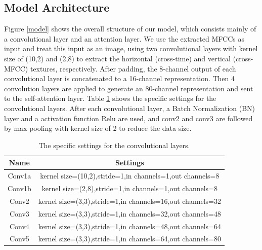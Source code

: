 \documentclass[10pt, conference, compsocconf]{IEEEtran}
\begin{document}
\subsection{Model Architecture}
Figure \ref{model} shows the overall structure of our model, which consists mainly of a convolutional layer and an attention layer.
We use the extracted MFCCs as input and treat this input as an image, using two convolutional layers with kernel size of (10,2) and (2,8) to extract the horizontal (cross-time) and vertical (cross-MFCC) textures, respectively. After padding, the 8-channel output of each convolutional layer is concatenated to a 16-channel representation. Then 4 convolution layers are applied to generate an 80-channel representation and sent to the self-attention layer. 
Table \ref{ConvSettings} shows the specific settings for the convolutional layers. After each convolutional layer, a Batch Normalization (BN) layer and a activation function Relu are used, and conv2 and conv3 are followed by max pooling with kernel size of 2 to reduce the data size.
\begin{table}[h]
	\renewcommand\arraystretch{1.5}
	\setlength{\abovecaptionskip}{-0.2cm}
	\caption{The specific settings for the convolutional layers.}
	\label{ConvSettings}
	\begin{center}  
		\begin{tabular}{|c|c|} 
			\hline  
			Name & Settings \\   
			\hline  
			Conv1a & kernel size=(10,2),stride=1,in channels=1,out channels=8\\   
			\hline
			Conv1b & kernel size=(2,8),stride=1,in channels=1,out channels=8 \\   
			\hline
			Conv2 & kernel size=(3,3),stride=1,in channels=16,out channels=32 \\   
			\hline
			Conv3 & kernel size=(3,3),stride=1,in channels=32,out channels=48 \\   
			\hline
			Conv4 & kernel size=(3,3),stride=1,in channels=48,out channels=64 \\   
			\hline
			Conv5 & kernel size=(3,3),stride=1,in channels=64,out channels=80 \\   
			\hline
		\end{tabular}  
	\end{center}  
\end{table}
\end{document}
